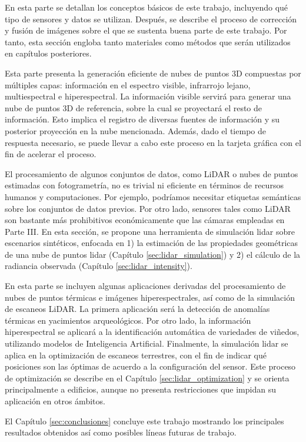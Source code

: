 \small \textbf{} \normalsize\hspace{\partSpacing} En esta parte se detallan los conceptos básicos de este trabajo, incluyendo qué tipo de sensores y datos se utilizan. Después, se describe el proceso de corrección y fusión de imágenes sobre el que se sustenta buena parte de este trabajo. Por tanto, esta sección engloba tanto materiales como métodos que serán utilizados en capítulos posteriores.

\small \textbf{} \normalsize\hspace{\partSpacing} Esta parte presenta la generación eficiente de nubes de puntos 3D compuestas por múltiples capas: información en el espectro visible, infrarrojo lejano, multiespectral e hiperespectral. La información visible servirá para generar una nube de puntos 3D de referencia, sobre la cual se proyectará el resto de información. Esto implica el registro de diversas fuentes de información y su posterior proyección en la nube mencionada. Además, dado el tiempo de respuesta necesario, se puede llevar a cabo este proceso en la tarjeta gráfica con el fin de acelerar el proceso. 

\small \textbf{} \normalsize\hspace{\partSpacing} El procesamiento de algunos conjuntos de datos, como LiDAR o nubes de puntos estimadas con fotogrametría, no es trivial ni eficiente en términos de recursos humanos y computaciones. Por ejemplo, podríamos necesitar etiquetas semánticas sobre los conjuntos de datos previos. Por otro lado, sensores tales como LiDAR son bastante más prohibitivos económicamente que las cámaras empleadas en Parte III. En esta sección, se propone una herramienta de simulación \acrshort{lidar} sobre escenarios sintéticos, enfocada en 1) la estimación de las propiedades geométricas de una nube de puntos \acrshort{lidar} (Capítulo \ref{sec:lidar_simulation}) y 2) el cálculo de la radiancia observada (Capítulo \ref{sec:lidar_intensity}). 

\small \textbf{} \normalsize\hspace{\partSpacing} En esta parte se incluyen algunas aplicaciones derivadas del procesamiento de nubes de puntos térmicas e imágenes hiperespectrales, así como de la simulación de escaneos LiDAR. La primera aplicación será la detección de anomalías térmicas en yacimientos arqueológicos. Por otro lado, la información hiperespectral se aplicará a la identificación automática de variedades de viñedos, utilizando modelos de Inteligencia Artificial. Finalmente, la simulación \acrshort{lidar} se aplica en la optimización de escaneos terrestres, con el fin de indicar qué posiciones son las óptimas de acuerdo a la configuración del sensor. Este proceso de optimización se describe en el Capítulo \ref{sec:lidar_optimization} y se orienta principalmente a edificios, aunque no presenta restricciones que impidan su aplicación en otros ámbitos.

\small \textbf{} \normalsize\hspace{3mm} El Capítulo \ref{sec:conclusiones} concluye este trabajo mostrando los principales resultados obtenidos así como posibles líneas futuras de trabajo.